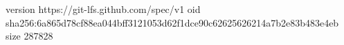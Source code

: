 version https://git-lfs.github.com/spec/v1
oid sha256:6a865d78cf88ea044bff3121053d62f1dce90c62625626214a7b2e83b483e4eb
size 287828
